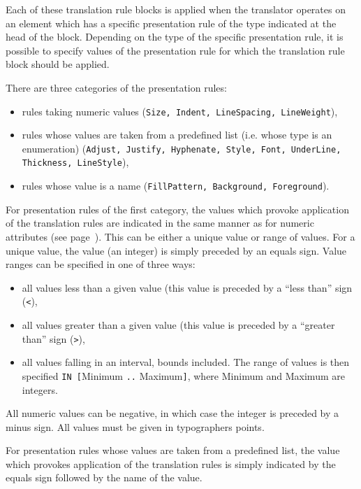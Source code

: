 Each of these translation rule blocks is applied when the translator
operates on an element which has a specific presentation rule of the
type indicated at the head of the block.  Depending on the type of the
specific presentation rule, it is possible to specify values of the
presentation rule for which the translation rule block should be
applied.

There are three categories of the presentation rules:
\begin{itemize}
\item
rules taking numeric values ({\tt Size, Indent, LineSpacing, LineWeight}),
\item
rules whose values are taken from a predefined list (i.e. whose type
is an enumeration) ({\tt Adjust,
Justify, Hyphenate, Style, Font, UnderLine,\\ Thickness, LineStyle}),
\item
rules whose value is a name ({\tt FillPattern, Background, Foreground}).
\end{itemize}

For presentation rules of the first category, the values which provoke
application of the translation rules are indicated in the same manner
as for numeric attributes (see page~\pageref{relattr}).  This can be
either a unique value or range of values.  For a unique value, the
value (an integer) is simply preceded by an equals sign.  Value ranges
can be specified in one of three ways:
\begin{itemize}

\item all values less than a given value (this value is preceded by a
``less than'' sign ({\tt <}),

\item all values greater than a given value (this value is preceded by a
``greater than'' sign ({\tt >}),

\item all values falling in an interval, bounds included.  The range
of values is then specified {\tt IN [}Minimum {\tt ..} Maximum{\tt]},
where Minimum and Maximum are integers.

\end{itemize}
All numeric values can be negative, in which case the integer is
preceded by a minus sign.  All values must be given in typographers
points.

For presentation rules whose values are taken from a predefined list,
the value which provokes application of the translation rules is
simply indicated by the equals sign followed by the name of the value.

